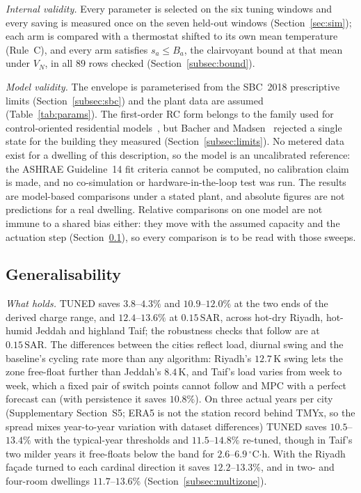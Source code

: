 \documentclass[3p,twocolumn,number]{elsarticle}
\newcommand{\SAR}{\text{SAR}}
\begin{document}
\emph{Internal validity.} Every parameter is selected on the six tuning windows and every saving is measured once on the seven held-out windows (Section~\ref{sec:sim}); each arm is compared with a thermostat shifted to its own mean temperature (Rule~C), and every arm satisfies $s_a\le B_a$, the clairvoyant bound at that mean under $V_N$, in all $89$ rows checked (Section~\ref{subsec:bound}).

\emph{Model validity.} The envelope is parameterised from the SBC~2018 prescriptive limits (Section~\ref{subsec:sbc}) and the plant data are assumed (Table~\ref{tab:params}). The first-order RC form belongs to the family used for control-oriented residential models~\cite{Wang2021RC,Shi2022}, but Bacher and Madsen~\cite{Bacher2011} rejected a single state for the building they measured (Section~\ref{subsec:limits}). No metered data exist for a dwelling of this description, so the model is an uncalibrated reference: the ASHRAE Guideline~14 fit criteria cannot be computed, no calibration claim is made, and no co-simulation or hardware-in-the-loop test was run. The results are model-based comparisons under a stated plant, and absolute figures are not predictions for a real dwelling. Relative comparisons on one model are not immune to a shared bias either: they move with the assumed capacity and the actuation step (Section~\ref{subsec:generalisability}), so every comparison is to be read with those sweeps.

\subsection{Generalisability}
\label{subsec:generalisability}

\emph{What holds.} TUNED saves $3.8$--$4.3\%$ and $10.9$--$12.0\%$ at the two ends of the derived charge range, and $12.4$--$13.6\%$ at $0.15\,\SAR$, across hot-dry Riyadh, hot-humid Jeddah and highland Taif; the robustness checks that follow are at $0.15\,\SAR$. The differences between the cities reflect load, diurnal swing and the baseline's cycling rate more than any algorithm: Riyadh's $12.7\,$K swing lets the zone free-float further than Jeddah's $8.4\,$K, and Taif's load varies from week to week, which a fixed pair of switch points cannot follow and MPC with a perfect forecast can (with persistence it saves $10.8\%$). On three actual years per city (Supplementary Section~S5; ERA5 is not the station record behind TMYx, so the spread mixes year-to-year variation with dataset differences) TUNED saves $10.5$--$13.4\%$ with the typical-year thresholds and $11.5$--$14.8\%$ re-tuned, though in Taif's two milder years it free-floats below the band for $2.6$--$6.9\,^\circ$C$\cdot$h. With the Riyadh façade turned to each cardinal direction it saves $12.2$--$13.3\%$, and in two- and four-room dwellings $11.7$--$13.6\%$ (Section~\ref{subsec:multizone}).
\end{document}
